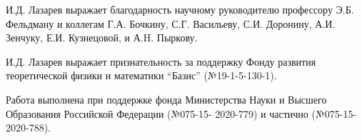 И.Д. Лазарев выражает благодарность научному руководителю профессору Э.Б. Фельдману
и коллегам
Г.А. Бочкину,
С.Г. Васильеву,
С.И. Доронину,
А.И. Зенчуку,
Е.И. Кузнецовой,
и А.H. Пыркову.

И.Д. Лазарев выражает признательность за поддержку Фонду развития теоретической физики и математики ``Базис'' (№19-1-5-130-1).

Работа выполнена при поддержке фонда Министерства Науки и Высшего Образования Российской Федерации (№075-15- 2020-779) и частично (№075-15-2020-788).